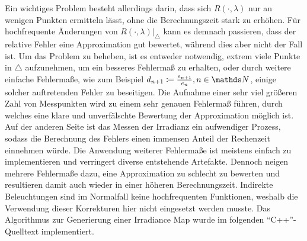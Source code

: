 		Ein wichtiges Problem besteht allerdings darin, dass sich $R(\cdot,\lambda)$ nur an wenigen Punkten ermitteln lässt, ohne die Berechnungszeit stark zu erhöhen.
		Für hochfrequente Änderungen von $R(\cdot,\lambda)\vert_\triangle$ kann es demnach passieren, dass der relative Fehler eine Approximation gut bewertet, während dies aber nicht der Fall ist.
		Um das Problem zu beheben, ist es entweder notwendig, extrem viele Punkte in $\triangle$ aufzunehmen, um ein besseres Fehlermaß zu erhalten, oder durch weitere einfache Fehlermaße, wie zum Beispiel $d_{n+1}\define \frac{e_{n+1}}{e_n},n\in\SN$, einige solcher auftretenden Fehler zu beseitigen.
		Die Aufnahme einer sehr viel größeren Zahl von Messpunkten wird zu einem sehr genauen Fehlermaß führen, durch welches eine klare und unverfälschte Bewertung der Approximation möglich ist.
		Auf der anderen Seite ist das Messen der Irradianz ein aufwendiger Prozess, sodass die Berechnung des Fehlers einen immensen Anteil der Rechenzeit einnehmen würde.
		Die Anwendung weiterer Fehlermaße ist meistens einfach zu implementieren und verringert diverse entstehende Artefakte.
		Dennoch neigen mehrere Fehlermaße dazu, eine Approximation zu schlecht zu bewerten und resultieren damit auch wieder in einer höheren Berechnungszeit.
		Indirekte Beleuchtungen sind im Normalfall keine hochfrequenten Funktionen, weshalb die Verwendung dieser Korrekturen hier nicht eingesetzt werden musste.
		Das Algorithmus zur Generierung einer Irradiance Map wurde im folgenden \enquote{C++}-Quelltext implementiert.

		

